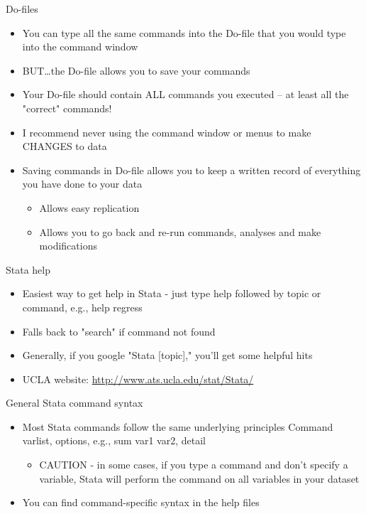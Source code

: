 \documentclass[table,smaller]{beamer}
\begin{document}
\begin{frame}[label=sec-1-6]{Do-files}
\begin{itemize}
\item You can type all the same commands into the Do-file that you would type into the command window
\item BUT\ldots{}the Do-file allows you to \alert{save} your commands
\item Your Do-file should contain ALL commands you executed -- at least all the "correct" commands!
\item I recommend never using the command window or menus to make CHANGES to data
\item Saving commands in Do-file allows you to keep a written record of everything you have done to your data
\begin{itemize}
\item Allows easy replication
\item Allows you to go back and re-run commands,  analyses and make modifications
\end{itemize}
\end{itemize}
\end{frame}


\begin{frame}[label=sec-1-7]{Stata help}
\begin{itemize}
\item Easiest way to get help in Stata - just type \alert{help} followed by topic or command, e.g., 
\alert{help regress}
\item Falls back to "search" if command not found
\item Generally, if you google "Stata [topic]," you'll get some helpful hits
\item UCLA website:
\url{http://www.ats.ucla.edu/stat/Stata/}
\end{itemize}
\end{frame}

\begin{frame}[label=sec-1-8]{General Stata command syntax}
\begin{itemize}
\item Most Stata commands follow the same underlying principles
\alert{Command varlist, options}, e.g., \alert{sum var1 var2, detail}
\begin{itemize}
\item CAUTION - in some cases, if you type a command and don't specify a variable, Stata will perform the command on all variables in your dataset
\end{itemize}
\item You can find command-specific syntax in the help files
\end{itemize}
\end{frame}
\end{document}
